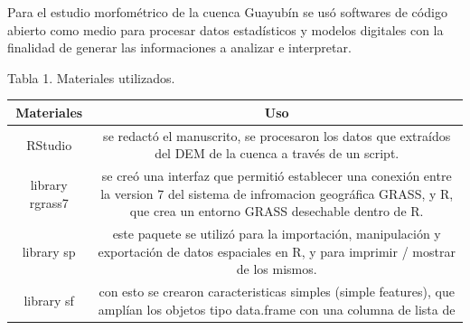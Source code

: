 \documentclass[11pt,]{article}
\begin{document}
Para el estudio morfométrico de la cuenca Guayubín se usó softwares de
código abierto como medio para procesar datos estadísticos y modelos
digitales con la finalidad de generar las informaciones a analizar e
interpretar.

Tabla 1. Materiales utilizados.

\begin{longtable}[]{@{}cc@{}}
\toprule
\begin{minipage}[b]{0.11\columnwidth}\centering\strut
Materiales\strut
\end{minipage} & \begin{minipage}[b]{0.83\columnwidth}\centering\strut
Uso\strut
\end{minipage}\tabularnewline
\midrule
\endhead
\begin{minipage}[t]{0.11\columnwidth}\centering\strut
RStudio\strut
\end{minipage} & \begin{minipage}[t]{0.83\columnwidth}\centering\strut
se redactó el manuscrito, se procesaron los datos que extraídos del DEM
de la cuenca a través de un script.\strut
\end{minipage}\tabularnewline
\begin{minipage}[t]{0.11\columnwidth}\centering\strut
library rgrass7\strut
\end{minipage} & \begin{minipage}[t]{0.83\columnwidth}\centering\strut
se creó una interfaz que permitió establecer una conexión entre la
version 7 del sistema de infromacion geográfica GRASS, y R, que crea un
entorno GRASS desechable dentro de R.\strut
\end{minipage}\tabularnewline
\begin{minipage}[t]{0.11\columnwidth}\centering\strut
library sp\strut
\end{minipage} & \begin{minipage}[t]{0.83\columnwidth}\centering\strut
este paquete se utilizó para la importación, manipulación y exportación
de datos espaciales en R, y para imprimir / mostrar de los mismos.\strut
\end{minipage}\tabularnewline
\begin{minipage}[t]{0.11\columnwidth}\centering\strut
library sf\strut
\end{minipage} & \begin{minipage}[t]{0.83\columnwidth}\centering\strut
con esto se crearon caracteristicas simples (simple features), que
amplían los objetos tipo data.frame con una columna de lista de

\end{minipage}
\end{longtable}
\end{document}
